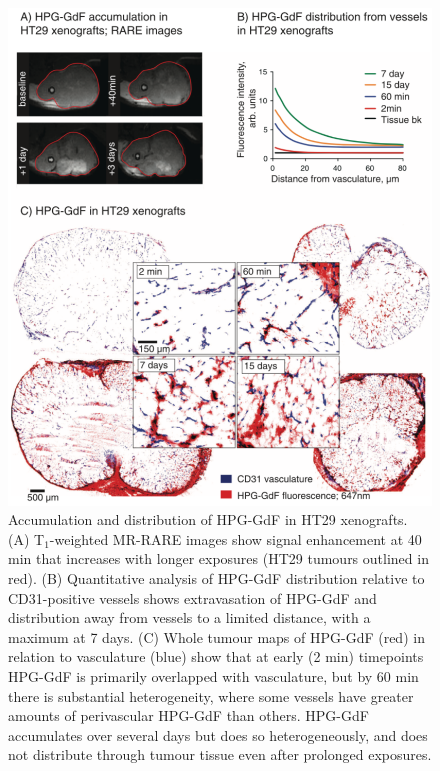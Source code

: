 \begin{figure}[htbp]
 \begin{center}
 \includegraphics[width=\textwidth]{hpg/hpg-paper1-images/hpg_fig3-hpgdistribution.png}
 \caption{Accumulation and distribution of \acs{HPG-GdF} in HT29 xenografts. (A) T$_1$-weighted MR-RARE images show signal enhancement at 40 min that increases with longer exposures (HT29 tumours outlined in red). (B) Quantitative analysis of \acs{HPG-GdF} distribution relative to \acs{CD31}-positive vessels shows extravasation of \acs{HPG-GdF} and distribution away from vessels to a limited distance, with a maximum at 7 days. (C) Whole tumour maps of \acs{HPG-GdF} (red) in relation to vasculature (blue) show that at early (2 min) timepoints \acs{HPG-GdF} is primarily overlapped with vasculature, but by 60 min there is substantial heterogeneity, where some vessels have greater amounts of perivascular \acs{HPG-GdF} than others. \acs{HPG-GdF} accumulates over several days but does so heterogeneously, and does not distribute through tumour tissue even after prolonged exposures.}
 \label{hpgpaper1:fig3}
 \end{center}
\end{figure}

